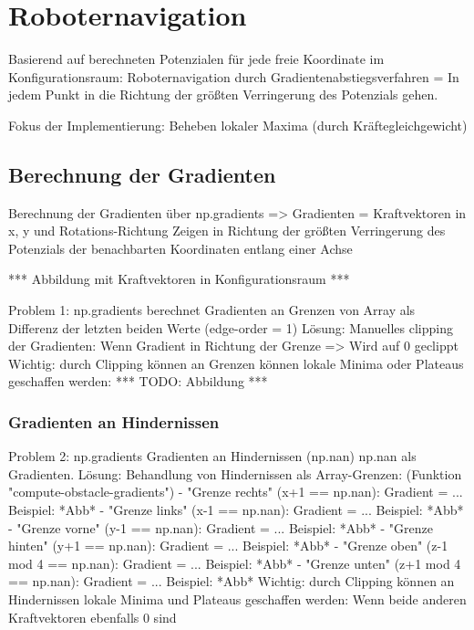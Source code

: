 \chapter{Roboternavigation}


Basierend auf berechneten Potenzialen für jede freie Koordinate im Konfigurationsraum: Roboternavigation durch Gradientenabstiegsverfahren = In jedem Punkt in die Richtung der größten Verringerung des Potenzials gehen.

Fokus der Implementierung: Beheben lokaler Maxima (durch Kräftegleichgewicht)

\section{Berechnung der Gradienten}

Berechnung der Gradienten über np.gradients => Gradienten = Kraftvektoren in x, y und Rotations-Richtung
Zeigen in Richtung der größten Verringerung des Potenzials der benachbarten Koordinaten entlang einer Achse

*** Abbildung mit Kraftvektoren in Konfigurationsraum ***

Problem 1: np.gradients berechnet Gradienten an Grenzen von Array als Differenz der letzten beiden Werte (edge-order = 1)
Lösung: Manuelles clipping der Gradienten: Wenn Gradient in Richtung der Grenze => Wird auf 0 geclippt
Wichtig: durch Clipping können an Grenzen können lokale Minima oder Plateaus geschaffen werden:
	*** TODO: Abbildung ***


\subsection{Gradienten an Hindernissen}

Problem 2: np.gradients Gradienten an Hindernissen (np.nan) np.nan als Gradienten. 
Lösung: Behandlung von Hindernissen als Array-Grenzen: (Funktion "compute-obstacle-gradients")
	- "Grenze rechts" (x+1 == np.nan): Gradient = ... Beispiel: *Abb*
	- "Grenze links" (x-1 == np.nan): Gradient = ... Beispiel: *Abb*
	- "Grenze vorne" (y-1 == np.nan): Gradient = ... Beispiel: *Abb*
	- "Grenze hinten" (y+1 == np.nan): Gradient = ... Beispiel: *Abb*
	- "Grenze oben" (z-1 mod 4 == np.nan): Gradient = ... Beispiel: *Abb*
	- "Grenze unten" (z+1 mod 4 == np.nan): Gradient = ... Beispiel: *Abb*
Wichtig: durch Clipping können an Hindernissen lokale Minima und Plateaus geschaffen werden: Wenn beide anderen Kraftvektoren ebenfalls 0 sind 


